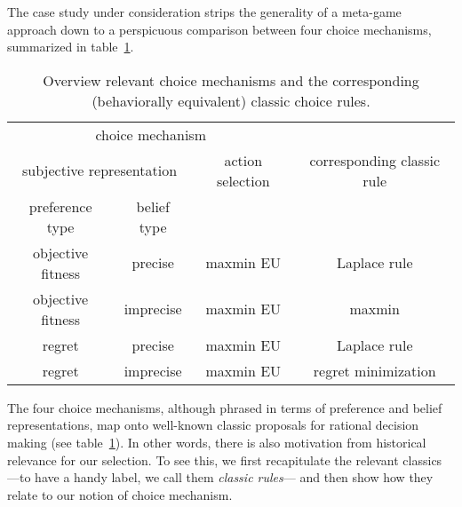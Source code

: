 \documentclass[fleqn,reqno,12pt]{article}
\theoremstyle{Satz}
\theoremstyle{Bsp}
\begin{document}
The case study under consideration strips the generality of a meta-game approach down to a perspicuous
comparison between four choice mechanisms, summarized in table~\ref{tab:CMs}.
\begin{table}[t]
  \centering
  \begin{tabular}{cccc}
  \multicolumn{3}{c}{choice mechanism} \\  \cmidrule(r){1-3}
    \multicolumn{2}{c}{subjective representation} & action selection & corresponding classic rule \\  \cmidrule(r){1-2}
    preference type & belief type  \\ \midrule
    objective fitness & precise & maxmin EU &  Laplace rule \\
    objective fitness & imprecise & maxmin EU & maxmin \\ 
    regret & precise & maxmin EU & Laplace rule \\
    regret & imprecise & maxmin EU & regret minimization \\ 
  \end{tabular}
  \caption{Overview relevant choice mechanisms and the corresponding (behaviorally equivalent)
    classic choice rules.}
  \label{tab:CMs}
\end{table}
\iffalse
This exclusive selection of choice mechanisms is motivated by a number of
considerations. Firstly, the set of conceivable choice mechanisms is vast. Most of that
conceivable vastness is utter nonsense, and some selection of plausible candidates is required in
any case. Secondly, a restriction to only a small number of suitable candidates will
help demonstrate more distinctly how a meta game approach may help structure philosophical
inquiry, which is our main goal. Thirdly, our case study adds to the recent literature on the
evolution of preferences by making evident the possibly non-trivial interaction between
preference and belief representations, all else equal. This is our secondary goal. 
Finally,
\fi 
The
four choice mechanisms,  
although phrased in terms of preference and belief representations, map onto well-known classic
proposals for rational decision making (see table~\ref{tab:CMs}). In other words, there is also
motivation from historical relevance for our selection. To see this, we first recapitulate the
relevant classics ---to have a handy label, we call them \emph{classic rules}--- and then show
how they relate to our notion of choice mechanism.
\end{document}
